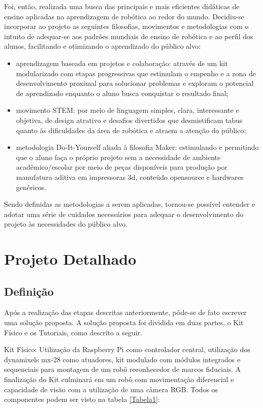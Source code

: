 Foi, então, realizada uma busca das principais e mais eficientes didáticas de ensino aplicadas na aprendizagem de robótica ao redor do mundo. Decidiu-se incorporar ao projeto as seguintes filosofias, movimentos e metodologias com o intuito de adequar-se aos padrões mundiais de ensino de robótica e ao perfil dos alunos, facilitando e otimizando o aprendizado do público alvo:
\begin{itemize}
	\item aprendizagem baseada em projetos e colaboração: através de um kit modularizado com etapas progressivas que estimulam o empenho e a zona de desenvolvimento proximal para solucionar problemas e exploram o potencial de aprendizado enquanto o aluno busca conquistar o resultado final;
	\item movimento STEM: por meio de linguagem simples, clara, interessante e objetiva, de design atrativo e desafios divertidos que desmistificam tabus quanto às dificuldades da área de robótica e atraem a atenção do público;
	\item metodologia Do-It-Yourself aliada à filosofia Maker: estimulando e permitindo que o aluno faça o próprio projeto sem a necessidade de ambiente acadêmico/escolar por meio de peças disponíveis para produção por manufatura aditiva em impressoras 3d, conteúdo opensource e hardwares genéricos.
\end{itemize}

Sendo definidas as metodologias a serem aplicadas, tornou-se possível entender e adotar uma série de cuidados necessários para adequar o desenvolvimento do projeto às necessidades do público alvo.

\section{Projeto Detalhado}
\subsection{Definição}
Após a realização das etapas descritas anteriormente, pôde-se de fato escrever uma solução proposta. A solução proposta foi dividida em duas partes, o Kit Físico e os Tutoriais, como descrito a seguir.

Kit Físico: Utilização da Raspberry Pi como controlador central, utilização dos dynamixels mx-28 como atuadores, kit modulado com módulos integrados e sequenciais para montagem de um robô reconhecedor de marcos fiduciais. A finalização do Kit culminará em um robô com movimentação diferencial e capacidade de visão com a utilização de uma câmera RGB. Todos os componentes podem ser  visto na tabela \ref{Tabela1}:

